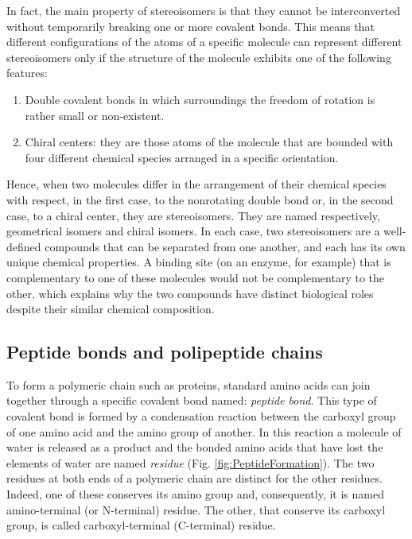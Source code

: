In fact, the main property of stereoisomers is that they cannot be interconverted without temporarily breaking one or more covalent bonds. This means that different configurations of the atoms of a specific molecule can represent different stereoisomers only if the structure of the molecule exhibits one of the following features:
\begin{enumerate}
\item Double covalent bonds in which surroundings the freedom of rotation is rather small or non-existent.
\item Chiral centers: they are those atoms of the molecule that are bounded with four different chemical species arranged in a specific orientation. 
\end{enumerate}

Hence, when two molecules differ in the arrangement of their chemical species with respect, in the first case, to the nonrotating double bond or, in the second case, to a chiral center, they are stereoisomers. They are named respectively, geometrical isomers and chiral isomers. 
In each case, two stereoisomers are a well-defined compounds that can be separated from one another, and each has its own unique chemical properties. A binding site (on an enzyme, for example) that is complementary to one of these molecules would not be complementary to the other, which explains why the two compounds have distinct biological roles despite their similar chemical composition.

\subsection{Peptide bonds and polipeptide chains}\label{ssec:peptitde}
To form a polymeric chain such as proteins, standard amino acids can join together through a specific covalent bond named: \textit{peptide bond}. This type of covalent bond is formed by a condensation reaction between the carboxyl group of one amino acid and the amino group of another. In this reaction a molecule of water is released as a product and the bonded amino acids that have lost the elements of water are named \textit{residue} (Fig. \ref{fig:PeptideFormation}). The two residues at both ends of a polymeric chain are distinct for the other residues.
Indeed, one of these conserves its amino group and, consequently, it is named amino-terminal (or N-terminal) residue. The other, that conserve its carboxyl group, is called carboxyl-terminal (C-terminal) residue. 

